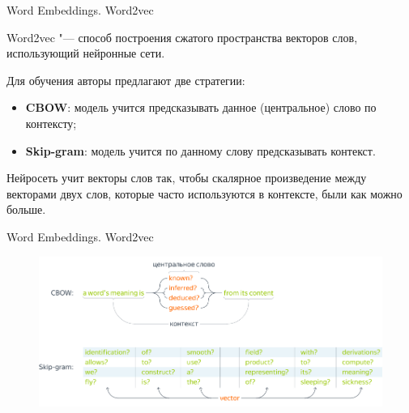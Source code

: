 \documentclass[notheorems, handout, 10pt]{beamer}
\begin{document}
	\begin{frame}{Word Embeddings. Word2vec}
		
		Word2vec "--- способ построения сжатого пространства векторов слов, использующий нейронные сети. 
		
		\vspace{0.2cm}
		
		Для обучения авторы предлагают две стратегии:
		\begin{itemize}
			\item \textbf{CBOW}: модель учится предсказывать данное (центральное) слово по контексту;
			\item \textbf{Skip-gram}: модель учится по данному слову предсказывать контекст.
		\end{itemize}
		
		\vspace{0.2cm}
		
		Нейросеть учит векторы слов так, чтобы скалярное произведение между векторами двух слов, которые часто используются в контексте, были как можно больше.
		
		\note{
			
		}
		
	\end{frame}
	
	\begin{frame}{Word Embeddings. Word2vec}
		
		\begin{figure}[H]
			\includegraphics[width=1\linewidth]{images/4}
		\end{figure}
		
		\note{
			
		}
		
	\end{frame}
	
\end{document}
